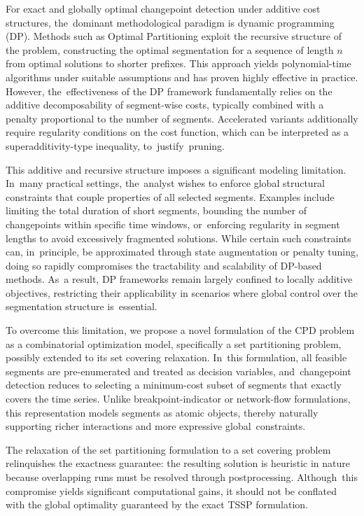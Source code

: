 \documentclass[mathematics,article,accept,pdftex,moreauthors]{Definitions/mdpi}
\begin{document}
For exact and globally optimal changepoint detection under additive cost structures, the~dominant methodological paradigm is dynamic programming (DP). Methods such as Optimal Partitioning exploit the recursive structure of the problem, constructing the optimal segmentation for a sequence of length $n$ from optimal solutions to shorter prefixes. This approach yields polynomial-time algorithms under suitable assumptions and has proven highly effective in practice. However, the~effectiveness of the DP framework fundamentally relies  on the additive decomposability of segment-wise costs, typically combined with a penalty proportional to the number of segments. Accelerated variants additionally require regularity conditions on the cost function, which can be interpreted as a superadditivity-type inequality, to~justify~pruning.

This additive and recursive structure imposes a significant modeling limitation. In~many practical settings, the~analyst wishes to enforce global structural constraints that couple properties of all selected segments. Examples include limiting the total duration of short segments, bounding the number of changepoints within specific time windows, or~enforcing regularity in segment lengths to avoid excessively fragmented solutions. While certain such constraints can, in~principle, be approximated through state augmentation or penalty tuning, doing so rapidly compromises the tractability and scalability of DP-based methods. As~a result, DP frameworks remain largely confined to locally additive objectives, restricting their applicability in scenarios where global control over the segmentation structure is~essential.

To overcome this limitation, we propose a novel formulation of the CPD problem as a combinatorial optimization model, specifically a set partitioning problem, possibly extended to its set covering relaxation. In~this formulation, all feasible segments are pre-enumerated and treated as decision variables, and~changepoint detection reduces to selecting a minimum-cost subset of segments that exactly covers the time series. Unlike breakpoint-indicator or network-flow formulations, this representation models segments as atomic objects, thereby naturally supporting richer interactions and more expressive global~constraints.
 
{The relaxation of the set partitioning formulation to a set covering problem relinquishes the exactness guarantee: the resulting solution is heuristic in nature because overlapping runs must be resolved through postprocessing. Although~this compromise yields significant computational gains, it should not be conflated with the global optimality guaranteed by the exact TSSP formulation.}
\end{document}
